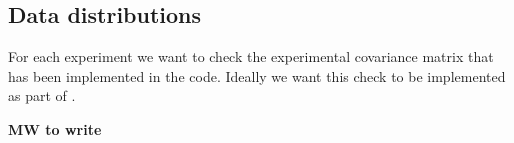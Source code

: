 \subsection{Data distributions}
\label{eq:data-distr}
For each experiment we want to check the experimental covariance matrix that has
been implemented in the \nnpdf code. Ideally we want this check to be
implemented as part of \valid. 

{\bf MW to write}